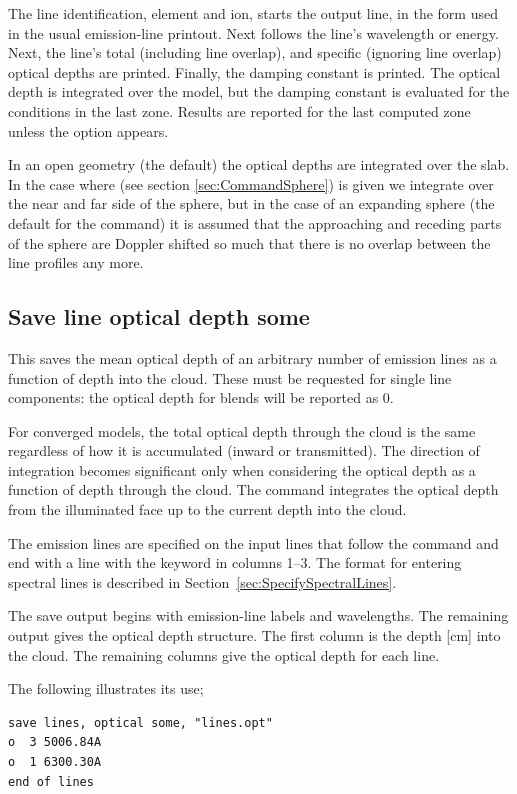 The line identification, element and ion, starts the output line, in
the form used in the usual emission-line printout.
Next follows the line's wavelength or energy.
Next, the line's total (including line overlap), and
specific (ignoring line overlap) optical depths are printed.
Finally, the damping constant is printed.
The optical depth is integrated over the model,
but the damping constant is evaluated for the
conditions in the last zone.
Results are reported for the last computed zone unless the  option
appears.

In an open geometry (the default) the optical depths are integrated over the slab.
In the case where  
(see section \ref{sec:CommandSphere}) is given we integrate over 
the near and far side
of the sphere, but in the case of an expanding sphere 
(the default for the  command) it is assumed that the 
approaching and receding parts of the sphere are Doppler shifted so much 
that there is no overlap between the line profiles any more.


\subsection{Save line optical depth some}

This saves the mean optical depth of an arbitrary number of emission lines as a
function of depth into the cloud.  These must be requested for single
line components: the optical depth for blends will be reported as 0.

For converged models, the total optical depth through the cloud is the same
regardless of how it is accumulated (inward or transmitted).
The direction of integration becomes significant only when
considering the optical depth as a function of depth through
the cloud.
The command integrates the optical depth from
the illuminated face up to the current depth into the cloud.

The emission lines are specified on the input lines that follow the
command and end with a line with the keyword  in columns 1--3.
The format for entering spectral lines is described in Section~\ref{sec:SpecifySpectralLines}.

The save output begins with emission-line labels and wavelengths.  The
remaining output gives the optical depth structure.  The first column is the
depth [cm] into the cloud.  The remaining columns give the optical depth for each line.  

The following illustrates its use;
\begin{verbatim}
save lines, optical some, "lines.opt"
o  3 5006.84A
o  1 6300.30A
end of lines
\end{verbatim}

